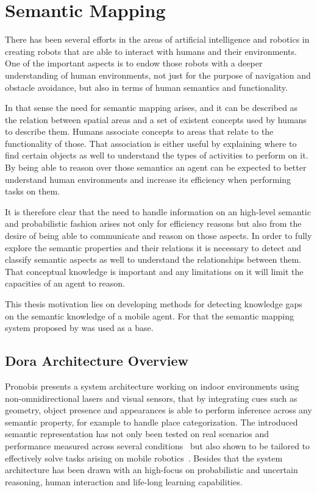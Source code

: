 \chapter{Semantic Mapping}\label{chap:semantic-mapping}

There has been several efforts in the areas of artificial intelligence and robotics
in creating robots that are able to interact with humans and their environments.
One of the important aspects is to endow those robots with a deeper understanding
of human environments, not just for the purpose of navigation and obstacle avoidance, 
but also in terms of human semantics and functionality.

In that sense the need for semantic mapping arises, and it can be described as the
relation between spatial areas and a set of existent concepts used by humans to
describe them.
Humans associate concepts to areas that relate to the functionality of those. That
association is either useful by explaining where to find certain objects as well to
understand the types of activities to perform on it.
By being able to reason over those semantics an agent can be expected to better
understand human environments and increase its efficiency when performing tasks on them.

It is therefore clear that the need to handle information on an high-level semantic and
probabilistic fashion arises not only for efficiency reasons but also from the desire
of being able to communicate and reason on those aspects.
In order to fully explore the semantic properties and their relations it is necessary to
detect and classify semantic aspects as well to understand the relationships between them.
That conceptual knowledge is important and any limitations on it will limit the capacities
of an agent to reason. 

This thesis motivation lies on developing methods for detecting knowledge gaps
on the semantic knowledge of a mobile agent. For that the semantic mapping system
proposed by \cite{pronobis2011phd} was used as a base.

\section{Dora Architecture Overview}
Pronobis presents a system architecture working on indoor environments using
non\hyp{}omnidirectional lasers and visual sensors, that by integrating cues such as geometry,
object presence and appearances is able to perform inference across any semantic property,
for example to handle place categorization.
The introduced semantic representation has not only been tested on real scenarios
and performance measured across several conditions~\cite{pronobis2007iros} but also shown
to be tailored to effectively solve tasks arising on mobile robotics~\cite{hanheide2011ijcai}.
Besides that the system architecture has been drawn with an high-focus on probabilistic
and uncertain reasoning, human interaction and life-long learning capabilities.

